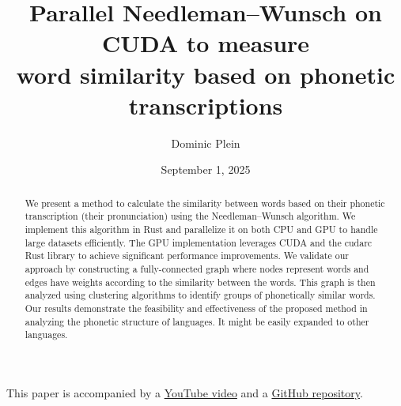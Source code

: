 \documentclass[10pt,a4paper,english]{article}
\title{\vspace{-0.0em}Parallel Needleman–Wunsch on CUDA to measure\\
word similarity based on phonetic transcriptions}
\author{Dominic Plein}
\date{September 1, 2025}
\newcommand{\abstractText}{\noindent
	\newline\noindent
    We present a method to calculate the similarity between words based on their phonetic transcription (their pronunciation) using the Needleman–Wunsch algorithm. We implement this algorithm in Rust and parallelize it on both CPU and GPU to handle large datasets efficiently. The GPU implementation leverages CUDA and the cudarc Rust library to achieve significant performance improvements. We validate our approach by constructing a fully-connected graph where nodes represent words and edges have weights according to the similarity between the words. This graph is then analyzed using clustering algorithms to identify groups of phonetically similar words. Our results demonstrate the feasibility and effectiveness of the proposed method in analyzing the phonetic structure of languages. It might be easily expanded to other languages.
}
\begin{document}
\setlength{\abovedisplayskip}{0.2em}

\maketitle

\begin{abstract}
    \abstractText
    \newline
    \newline
\end{abstract}

\vspace{-2em}
\begin{center}
    This paper is accompanied by a \href{https://youtu.be/xbcpnItE3_4}{YouTube video} and a \href{https://github.com/Splines/phonetics-graph/}{GitHub repository}.
\end{center}

\vspace{2em}

\begin{multicols*}{2}
\tableofcontents

\newcolumn







\renewcommand*{\glsgroupskip}{} %
\printglossary[type=\acronymtype]
\end{multicols*}

\printbibliography[
    heading=bibintoc,
    title={Bibliography},
    keyword={lit}
]
\printbibliography[
    title={Data sources \& Tools},
    keyword={data}
]
\end{document}

